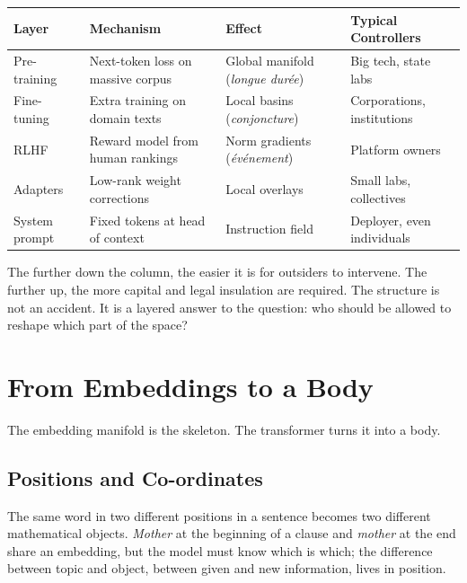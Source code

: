 \documentclass[12pt,a4paper]{article}
\begin{document}
\begin{formalbox}[title={Depths of Control in the Substrate}]
\begin{tabular}{@{}llll@{}}
\toprule
\textbf{Layer}      & \textbf{Mechanism}                         & \textbf{Effect}                                    & \textbf{Typical Controllers} \\ \midrule
Pre-training        & Next-token loss on massive corpus          & Global manifold (\emph{longue dur\'{e}e})          & Big tech, state labs         \\
Fine-tuning         & Extra training on domain texts             & Local basins (\emph{conjoncture})                  & Corporations, institutions   \\
RLHF                & Reward model from human rankings           & Norm gradients (\emph{\'{e}v\'{e}nement})          & Platform owners              \\
Adapters            & Low-rank weight corrections                & Local overlays                                     & Small labs, collectives      \\
System prompt       & Fixed tokens at head of context            & Instruction field                                  & Deployer, even individuals   \\ \bottomrule
\end{tabular}
\end{formalbox}

The further down the column, the easier it is for outsiders to intervene. The further up, the more capital and legal insulation are required. The structure is not an accident. It is a layered answer to the question: who should be allowed to reshape which part of the space?

\section{From Embeddings to a Body}

The embedding manifold is the skeleton. The transformer turns it into a body.

\subsection{Positions and Co-ordinates}

The same word in two different positions in a sentence becomes two different mathematical objects. \emph{Mother} at the beginning of a clause and \emph{mother} at the end share an embedding, but the model must know which is which; the difference between topic and object, between given and new information, lives in position.
\end{document}
